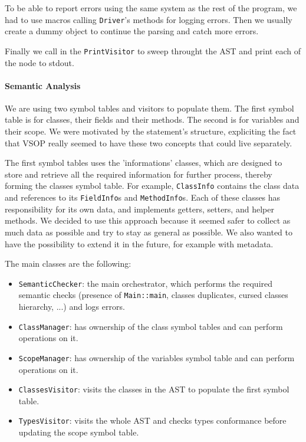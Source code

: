 \documentclass{article}
\begin{document}
To be able to report errors using the same system as the rest of the program, we had to use macros calling \texttt{Driver}'s methods for logging errors. Then we usually create a dummy object to continue the parsing and catch more errors.

Finally we call in the \texttt{PrintVisitor} to sweep throught the AST and print each of the node to stdout.

\paragraph{Semantic Analysis}

We are using two symbol tables and visitors to populate them. The first symbol table is for classes, their fields and their methods. The second is for variables and their scope. We were motivated by the statement's structure, expliciting the fact that VSOP really seemed to have these two concepts that could live separately.

The first symbol tables uses the 'informations' classes, which are designed to store and retrieve all the required information for further process, thereby forming the classes symbol table. For example, \texttt{ClassInfo} contains the class data and references to its \texttt{FieldInfo}s and \texttt{MethodInfo}s. Each of these classes has responsibility for its own data, and implements getters, setters, and helper methods. 
We decided to use this approach because it seemed safer to collect as much data as possible and try to stay as general as possible. We also wanted to have the possibility to extend it in the future, for example with metadata.

The main classes are the following:
\begin{itemize}
    \item \texttt{SemanticChecker}: the main orchestrator, which performs the required semantic checks (presence of \texttt{Main::main}, classes duplicates, cursed classes hierarchy, ...) and logs errors. 
    \item \texttt{ClassManager}: has ownership of the class symbol tables and can perform operations on it.
    \item \texttt{ScopeManager}: has ownership of the variables symbol table and can perform operations on it.
    \item \texttt{ClassesVisitor}: visits the classes in the AST to populate the first symbol table.
    \item \texttt{TypesVisitor}: visits the whole AST and checks types conformance before updating the scope symbol table.
\end{itemize}
\end{document}
